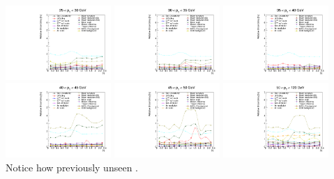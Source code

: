 
{
  \centering
  \includegraphics[width=0.3\textwidth]{dates/20121119/figures/unfold/uncertainties_pos_2.pdf}
  \includegraphics[width=0.3\textwidth]{dates/20121119/figures/unfold/uncertainties_pos_3.pdf}
  \includegraphics[width=0.3\textwidth]{dates/20121119/figures/unfold/uncertainties_pos_4.pdf}
  \newline
  \centering
  \includegraphics[width=0.3\textwidth]{dates/20121119/figures/unfold/uncertainties_pos_5.pdf}
  \includegraphics[width=0.3\textwidth]{dates/20121119/figures/unfold/uncertainties_pos_6.pdf}
  \includegraphics[width=0.3\textwidth]{dates/20121119/figures/unfold/uncertainties_pos_7.pdf}
  \newline
  \footnotesize{Notice how previously unseen .}
}

